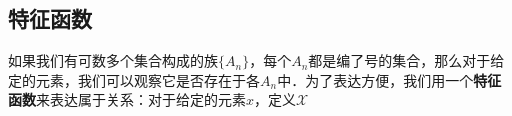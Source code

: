 
\subsection{特征函数}
如果我们有可数多个集合构成的族$\{A_n\}$，每个$A_n$都是编了号的集合，那么对于给定的元素，我们可以观察它是否存在于各$A_n$中．为了表达方便，我们用一个\textbf{特征函数}来表达属于关系：对于给定的元素$x$，定义$\mathcal{X}$